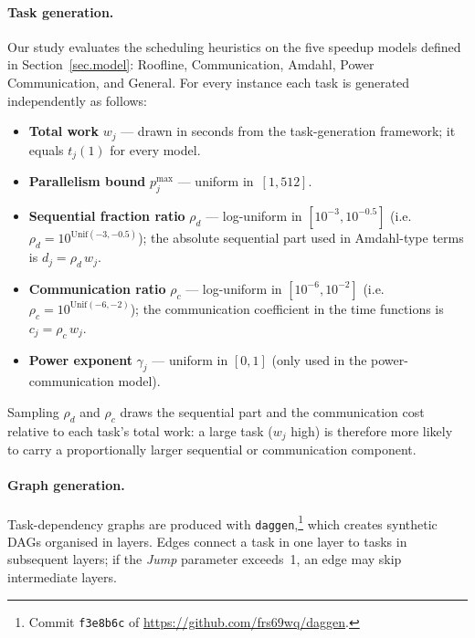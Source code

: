 \documentclass{article}
\begin{document}
\paragraph{Task generation.}
Our study evaluates the scheduling heuristics on the five speedup models
defined in Section~\ref{sec.model}:
Roofline, Communication, Amdahl, Power Communication, and General.
For every instance each task is generated independently as follows:

\begin{itemize}
    \item \textbf{Total work} \(w_j\) — drawn in seconds from the
          task-generation framework; it equals \(t_j(1)\) for every model.
    \item \textbf{Parallelism bound} \(p_j^{\max}\) — uniform in $\,[1,512]$.
    \item \textbf{Sequential fraction ratio} $\rho_d$
          — log-uniform in $[10^{-3},10^{-0.5}]$
          (i.e.\ $\rho_d = 10^{\mathrm{Unif}(-3,-0.5)}$);  
          the absolute sequential part used in Amdahl-type terms is
          \(d_j = \rho_d \, w_j\).
    \item \textbf{Communication ratio} $\rho_c$
          — log-uniform in $[10^{-6},10^{-2}]$
          (i.e.\ $\rho_c = 10^{\mathrm{Unif}(-6,-2)}$);  
          the communication coefficient in the time functions is
          \(c_j = \rho_c \, w_j\).
    \item \textbf{Power exponent} $\gamma_j$ — uniform in $[0,1]$
          (only used in the power-communication model).
\end{itemize}

\noindent
Sampling $\rho_d$ and $\rho_c$ draws the
sequential part and the communication cost relative to each task’s
total work: a large task ($w_j$ high) is therefore more likely to carry a
proportionally larger sequential or communication component.



\paragraph{Graph generation.}
Task-dependency graphs are produced with \texttt{daggen},\footnote{Commit
\texttt{f3e8b6c} of
\url{https://github.com/frs69wq/daggen}.}
which creates synthetic DAGs organised in layers.
Edges connect a task in one layer to tasks in subsequent layers; if the
\textit{Jump} parameter exceeds~1, an edge may skip intermediate layers.
\end{document}
